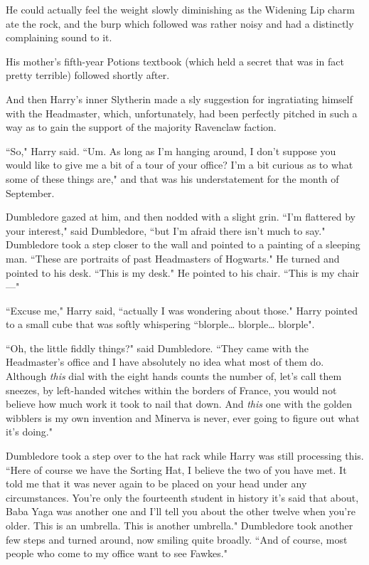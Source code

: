 He could actually feel the weight slowly diminishing as the Widening Lip charm ate the rock, and the burp which followed was rather noisy and had a distinctly complaining sound to it.

His mother's fifth-year Potions textbook (which held a secret that was in fact pretty terrible) followed shortly after.

And then Harry's inner Slytherin made a sly suggestion for ingratiating himself with the Headmaster, which, unfortunately, had been perfectly pitched in such a way as to gain the support of the majority Ravenclaw faction.

``So," Harry said. ``Um. As long as I'm hanging around, I don't suppose you would like to give me a bit of a tour of your office? I'm a bit curious as to what some of these things are," and that was his understatement for the month of September.

Dumbledore gazed at him, and then nodded with a slight grin. ``I'm flattered by your interest," said Dumbledore, ``but I'm afraid there isn't much to say." Dumbledore took a step closer to the wall and pointed to a painting of a sleeping man. ``These are portraits of past Headmasters of Hogwarts." He turned and pointed to his desk. ``This is my desk." He pointed to his chair. ``This is my chair—"

``Excuse me," Harry said, ``actually I was wondering about those." Harry pointed to a small cube that was softly whispering ``blorple{\ldots} blorple{\ldots} blorple".

``Oh, the little fiddly things?" said Dumbledore. ``They came with the Headmaster's office and I have absolutely no idea what most of them do. Although \emph{this} dial with the eight hands counts the number of, let's call them sneezes, by left-handed witches within the borders of France, you would not believe how much work it took to nail that down. And \emph{this} one with the golden wibblers is my own invention and Minerva is never, ever going to figure out what it's doing."

Dumbledore took a step over to the hat rack while Harry was still processing this. ``Here of course we have the Sorting Hat, I believe the two of you have met. It told me that it was never again to be placed on your head under any circumstances. You're only the fourteenth student in history it's said that about, Baba Yaga was another one and I'll tell you about the other twelve when you're older. This is an umbrella. This is another umbrella." Dumbledore took another few steps and turned around, now smiling quite broadly. ``And of course, most people who come to my office want to see Fawkes."

